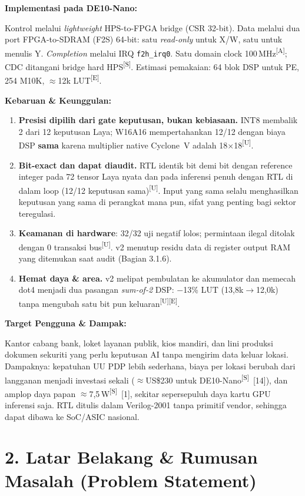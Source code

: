 \documentclass[10pt]{article}
\newcommand{\code}[1]{\texttt{\small #1}}
\newcommand{\lbl}[1]{\textbf{#1}\par}
\newcommand{\U}{\textsuperscript{[U]}}
\newcommand{\Sx}{\textsuperscript{[S]}}
\newcommand{\E}{\textsuperscript{[E]}}
\newcommand{\A}{\textsuperscript{[A]}}
\begin{document}
\lbl{Implementasi pada DE10-Nano:}
Kontrol melalui \emph{lightweight} HPS-to-FPGA bridge (CSR 32-bit). Data melalui dua port FPGA-to-SDRAM (F2S) 64-bit: satu \emph{read-only} untuk X/W, satu untuk menulis Y. \emph{Completion} melalui IRQ \code{f2h\_irq0}. Satu domain clock 100\,MHz\A; CDC ditangani bridge hard HPS\Sx. Estimasi pemakaian: 64 blok DSP untuk PE, 254 M10K, $\approx$12k LUT\E.

\lbl{Kebaruan \& Keunggulan:}
\begin{enumerate}
\item \textbf{Presisi dipilih dari gate keputusan, bukan kebiasaan.} INT8 membalik 2 dari 12 keputusan Laya; W16A16 mempertahankan 12/12 dengan biaya DSP \textbf{sama} karena multiplier native Cyclone~V adalah 18$\times$18\U.
\item \textbf{Bit-exact dan dapat diaudit.} RTL identik bit demi bit dengan reference integer pada 72 tensor Laya nyata dan pada inferensi penuh dengan RTL di dalam loop (12/12 keputusan sama)\U. Input yang sama selalu menghasilkan keputusan yang sama di perangkat mana pun, sifat yang penting bagi sektor teregulasi.
\item \textbf{Keamanan di hardware}: 32/32 uji negatif lolos; permintaan ilegal ditolak dengan 0 transaksi bus\U. v2 menutup residu data di register output RAM yang ditemukan saat audit (Bagian 3.1.6).
\item \textbf{Hemat daya \& area.} v2 melipat pembulatan ke akumulator dan memecah dot4 menjadi dua pasangan \emph{sum-of-2} DSP: $-$13\% LUT (13,8k$\rightarrow$12,0k) tanpa mengubah satu bit pun keluaran\U\E.
\end{enumerate}

\lbl{Target Pengguna \& Dampak:}
Kantor cabang bank, loket layanan publik, kios mandiri, dan lini produksi dokumen sekuriti yang perlu keputusan AI tanpa mengirim data keluar lokasi. Dampaknya: kepatuhan UU PDP lebih sederhana, biaya per lokasi berubah dari langganan menjadi investasi sekali ($\approx$US\$230 untuk DE10-Nano\Sx~[14]), dan amplop daya papan $\approx$7,5\,W\Sx~[1], sekitar sepersepuluh daya kartu GPU inferensi saja. RTL ditulis dalam Verilog-2001 tanpa primitif vendor, sehingga dapat dibawa ke SoC/ASIC nasional.

\section{2. Latar Belakang \& Rumusan Masalah (Problem Statement)}
\end{document}
